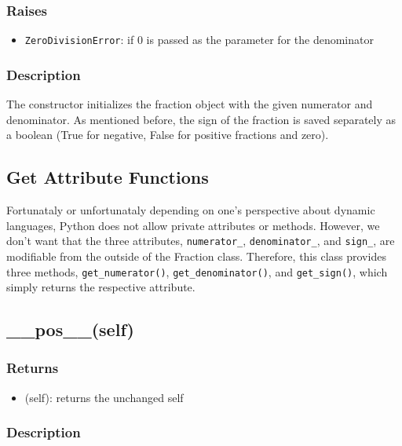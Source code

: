 \documentclass[refman]{scrartcl}
\begin{document}
\subsubsection*{Raises}

\begin{itemize}
  \item \texttt{ZeroDivisionError}: if \(0\) is passed as the parameter for the denominator
\end{itemize}

\subsubsection*{Description}

The constructor initializes the fraction object with the given numerator and denominator. As mentioned before, the sign of the fraction is saved separately as a boolean (True for negative, False for positive fractions and zero). 

\subsection{Get Attribute Functions}

Fortunataly or unfortunataly depending on one's perspective about dynamic languages, Python does not allow private attributes or methods. However, we don't want that the three attributes, \texttt{numerator\_}, \texttt{denominator\_}, and \texttt{sign\_}, are modifiable from the outside of the Fraction class. Therefore, this class provides three methods, \texttt{get\_numerator()}, \texttt{get\_denominator()}, and \texttt{get\_sign()}, which simply returns the respective attribute.

\subsection{\_\_pos\_\_(self)}

\subsubsection*{Returns}

\begin{itemize}
  \item (self): returns the unchanged self
\end{itemize}

\subsubsection*{Description}
\end{document}
